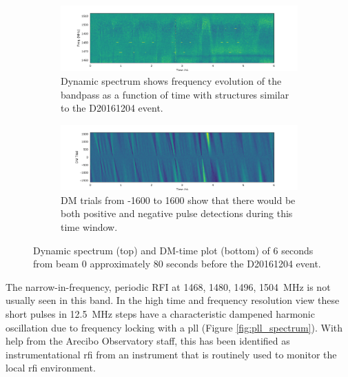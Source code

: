 \documentclass[a4paper,fleqn,usenatbib]{mnras}
\begin{document}
\begin{figure}
    \centering
    \begin{subfigure}[t]{1.0\textwidth}
        \centering\captionsetup{width=.95\linewidth}
        \includegraphics[width=1.0\textwidth]{figures/D20161204_spect_buf21_Beam0.pdf}
        \caption{Dynamic spectrum shows frequency evolution of the bandpass as a
        function of time with structures similar to the D20161204 event.
        }
        \label{fig:beam0_dynamic_spec_80s}
    \end{subfigure}
    \begin{subfigure}[t]{1.0\textwidth}
        \centering\captionsetup{width=.95\linewidth}
        \includegraphics[width=1.0\textwidth]{figures/D20161204_dmtrials_buf21_Beam0.pdf}
        \caption{DM trials from -1600 to 1600 show that there would be both
        positive and negative pulse detections during this time window.
        }
        \label{fig:beam0_dmtrials_80s}
    \end{subfigure}
    \caption{Dynamic spectrum (top) and DM-time plot (bottom) of 6 seconds from
    beam 0 approximately 80 seconds before the D20161204 event.
    }
    \label{fig:beamo0_80s}
\end{figure}

The narrow-in-frequency, periodic RFI at 1468, 1480, 1496, 1504~MHz is not
usually seen in this band. In the high time and frequency resolution view these
short pulses in 12.5~MHz steps have a characteristic dampened harmonic
oscillation due to frequency locking with a \gls{pll} (Figure
\ref{fig:pll_spectrum}). With help from the Arecibo Observatory staff, this has
been identified as instrumentational \gls{rfi} from an instrument that is
routinely used to monitor the local \gls{rfi} environment.
\end{document}

